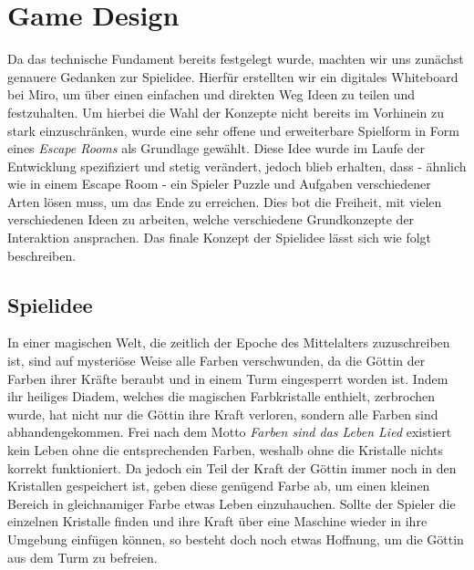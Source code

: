\chapter{Game Design}
Da das technische Fundament bereits festgelegt wurde, machten wir uns zunächst genauere Gedanken zur Spielidee. Hierfür erstellten wir ein digitales Whiteboard bei Miro, um über einen einfachen und direkten Weg Ideen zu teilen und festzuhalten. Um hierbei die Wahl der Konzepte nicht bereits im Vorhinein zu stark einzuschränken, wurde eine sehr offene und erweiterbare Spielform in Form eines \textit{Escape Rooms} als Grundlage gewählt. Diese Idee wurde im Laufe der Entwicklung spezifiziert und stetig verändert, jedoch blieb erhalten, dass - ähnlich wie in einem Escape Room - ein Spieler Puzzle und Aufgaben verschiedener Arten lösen muss, um das Ende zu erreichen. Dies bot die Freiheit, mit vielen verschiedenen Ideen zu arbeiten, welche verschiedene Grundkonzepte der Interaktion ansprachen. Das finale Konzept der Spielidee lässt sich wie folgt beschreiben.
\section{Spielidee}
In einer magischen Welt, die zeitlich der Epoche des Mittelalters zuzuschreiben ist, sind auf mysteriöse Weise alle Farben verschwunden, da die Göttin der Farben ihrer Kräfte beraubt und in einem Turm eingesperrt worden ist. Indem ihr heiliges Diadem, welches die magischen Farbkristalle enthielt, zerbrochen wurde, hat nicht nur die Göttin ihre Kraft verloren, sondern alle Farben sind abhandengekommen. Frei nach dem Motto \textit{Farben sind das Leben Lied} existiert kein Leben ohne die entsprechenden Farben, weshalb ohne die Kristalle nichts korrekt funktioniert. Da jedoch ein Teil der Kraft der Göttin immer noch in den Kristallen gespeichert ist, geben diese genügend Farbe ab, um einen kleinen Bereich in gleichnamiger Farbe etwas Leben einzuhauchen. Sollte der Spieler die einzelnen Kristalle finden und ihre Kraft über eine Maschine wieder in ihre Umgebung einfügen können, so besteht doch noch etwas Hoffnung, um die Göttin aus dem Turm zu befreien.\\
